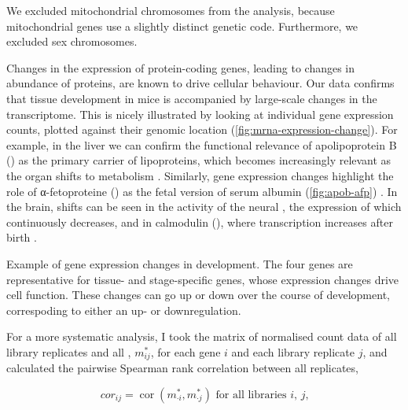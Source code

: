 We excluded mitochondrial chromosomes from the analysis, because mitochondrial
genes use a slightly distinct genetic code\todo[ref]{}. Furthermore, we excluded
sex chromosomes.

Changes in the expression of protein-coding genes, leading to changes in
abundance of proteins, are known to drive cellular behaviour\todo[ref]{}. Our
data confirms that tissue development in mice is accompanied by large-scale
changes in the \mrna transcriptome. This is nicely illustrated by looking at
individual gene expression counts, plotted against their genomic location
(\cref{fig:mrna-expression-change}). For example, in the liver we can confirm
the functional relevance of apolipoprotein B () as the
primary carrier of lipoproteins, which becomes increasingly relevant as the
organ shifts to metabolism \citep{Knott:1986}. Similarly, \mrna gene expression
changes highlight the role of α-fetoproteine () as the
fetal version of serum albumin (\cref{fig:apob-afp}) \citep{Chen:1997}. In the
brain, shifts can be seen in the activity of the neural \tf
{}, the expression of which continuously decreases, and in
calmodulin (), where transcription increases after birth
\citep{Tsui:2013,Huang:2011}.

    {Example of gene expression changes in development.}
    {The four genes are representative for tissue- and stage-specific genes,
    whose expression changes drive cell function. These changes can go up or
    down over the course of development, correspoding to either an up- or
    downregulation.}

For a more systematic analysis, I took the matrix of normalised count data of
all library replicates and all \mrna[s], \(m_{ij}^*\), for each \mrna gene \(i\)
and each library replicate \(j\), and calculated the pairwise Spearman rank
correlation between all replicates,

\begin{equation}
    cor_{ij} = \operatorname{cor}(m_{\cdot i}^*, m_{\cdot j}^*) \text{\ for all
        libraries \(i\), \(j\),}
\end{equation}

